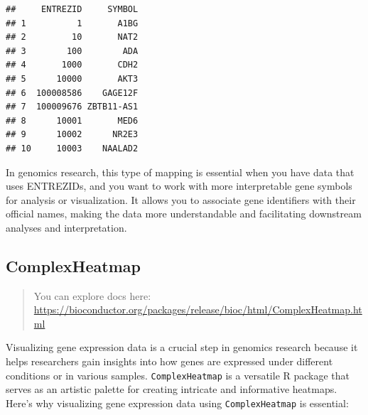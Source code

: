 \documentclass[
]{book}
\begin{document}
\begin{verbatim}
##     ENTREZID     SYMBOL
## 1          1       A1BG
## 2         10       NAT2
## 3        100        ADA
## 4       1000       CDH2
## 5      10000       AKT3
## 6  100008586    GAGE12F
## 7  100009676 ZBTB11-AS1
## 8      10001       MED6
## 9      10002      NR2E3
## 10     10003    NAALAD2
\end{verbatim}

In genomics research, this type of mapping is essential when you have data that uses ENTREZIDs, and you want to work with more interpretable gene symbols for analysis or visualization. It allows you to associate gene identifiers with their official names, making the data more understandable and facilitating downstream analyses and interpretation.

\hypertarget{complexheatmap}{%
\subsection{ComplexHeatmap}\label{complexheatmap}}

\begin{quote}
You can explore docs here: \url{https://bioconductor.org/packages/release/bioc/html/ComplexHeatmap.html}
\end{quote}

Visualizing gene expression data is a crucial step in genomics research because it helps researchers gain insights into how genes are expressed under different conditions or in various samples. \texttt{ComplexHeatmap} is a versatile R package that serves as an artistic palette for creating intricate and informative heatmaps. Here's why visualizing gene expression data using \texttt{ComplexHeatmap} is essential:
\end{document}
